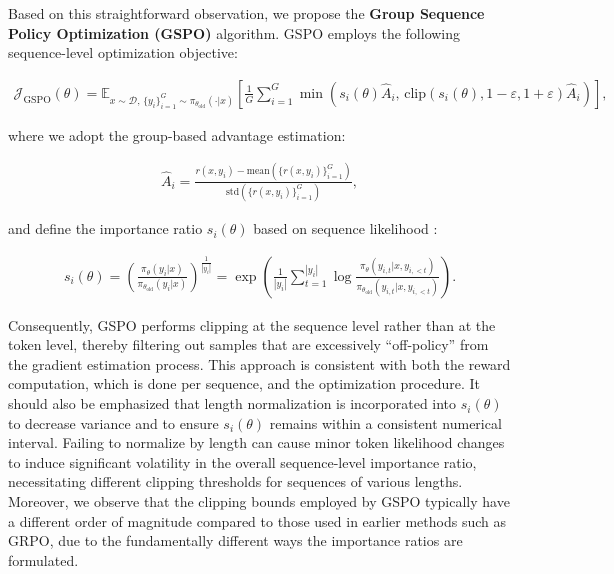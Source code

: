 Based on this straightforward observation, we propose the \textbf{Group Sequence Policy Optimization (GSPO)} algorithm. GSPO employs the following sequence-level optimization objective:

\begin{align}
\mathcal{J}_\text{GSPO} (\theta) =
\mathbb{E}_{ x \sim \mathcal{D},\, \{y_i\}_{i=1}^G \sim \pi_{\theta_\text{old}}( \cdot | x) }
\left[ 
\frac{1}{G} \sum_{i=1}^{G}
\min \left( s_{i}(\theta)  \widehat{A}_{i},  \, \mathrm{clip} \left( s_{i}(\theta), 1 - {\varepsilon}, 1 + {\varepsilon} \right) \widehat{A}_{i} \right) 
\right],
\label{equ:gspo}
\end{align}

where we adopt the group-based advantage estimation:

\begin{align}
\widehat{A}_{i} = \frac{r(x, y_i) - \mathrm{mean} \left( \{ r(x, y_i) \}_{i=1}^G \right) }{ \mathrm{std} \left( \{ r(x, y_i) \}_{i=1}^G \right) },
\end{align}

and define the importance ratio $s_{i}(\theta)$ based on sequence likelihood \citep{click}:

\begin{align}
s_{i}(\theta) = \left( \frac{ \pi_{\theta} (y_i | x) }{ \pi_{\theta_\text{old}} (y_i | x)} \right)^{\frac{1}{|y_i|}}
=
\exp \left( \frac{1}{|y_i|} \sum_{t=1}^{|y_i|} \log \frac{ \pi_{\theta} (y_{i,t} | x, y_{i,<t}) }{ \pi_{\theta_\text{old}} (y_{i,t} | x,y_{i,<t})} \right).
\end{align}

Consequently, GSPO performs clipping at the sequence level rather than at the token level, thereby filtering out samples that are excessively ``off-policy'' from the gradient estimation process. This approach is consistent with both the reward computation, which is done per sequence, and the optimization procedure. It should also be emphasized that length normalization is incorporated into $s_{i}(\theta)$ to decrease variance and to ensure $s_{i}(\theta)$ remains within a consistent numerical interval. Failing to normalize by length can cause minor token likelihood changes to induce significant volatility in the overall sequence-level importance ratio, necessitating different clipping thresholds for sequences of various lengths. Moreover, we observe that the clipping bounds employed by GSPO typically have a different order of magnitude compared to those used in earlier methods such as GRPO, due to the fundamentally different ways the importance ratios are formulated.

